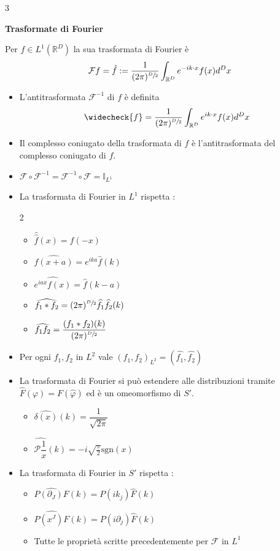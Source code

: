 \documentclass[10pt,a4paper]{report}
\begin{document}
\begin{multicols*}{3}
\begin{center}
\textbf{\boldmath Trasformate di Fourier\unboldmath} \par
Per $f\in L^1(\mathbb{R}^D)$ la sua trasformata di Fourier è 
\[
	\mathcal{F}f=\hat{f}:=\dfrac{1}{(2\pi)^{\sfrac{D}{2}}} \int_{\mathbb{R}^D} e^{-ik\cdot x}f(x) d^Dx
\]
	\begin{itemize}[label=$\cdot$]
		\item L'antitrasformata $\mathcal{F}^{-1}$ di $f$ è definita \[\widecheck{f}=\dfrac{1}{(2\pi)^{\sfrac{D}{2}}} \int_{\mathbb{R}^D} e^{ik\cdot x}f(x) d^Dx\]
		\item Il complesso coniugato della trasformata di $f$ è l'antitrasformata del complesso coniugato di $f$.
		\item $\mathcal{F}\circ\mathcal{F}^{-1}=\mathcal{F}^{-1}\circ\mathcal{F}=\mathbb{I}_{L^1}$
		\item La trasformata di Fourier in $L^1$ rispetta :
			\begin{multicols*}{2}
				\begin{itemize}[label=$\cdot$]
					\item $\widehat{\widehat{f}}(x)=f(-x)$
					\item $\widehat{f(x+a)}=e^{ika}\widehat{f}(k)$
					\item $\widehat{e^{iax}f(x)}=\widehat{f}(k-a) $
					\item $\widehat{f_1*f_2}=(2\pi)^{\sfrac{D}{2}} \widehat{f_1}\widehat{f_2}(k)$
					\item $\widehat{f_1f_2}=\dfrac{(f_1*f_2)(k)}{(2\pi)^{\sfrac{D}{2}}}$
				\end{itemize}
			\end{multicols*}
		\item Per ogni $f_1,f_2$ in $L^2$ vale $(f_1,f_2)_{L^2}=(\widehat{f_1},\widehat{f_2})$
		\item La trasformata di Fourier si può estendere alle distribuzioni tramite $\widehat{F}(\varphi)=F(\widehat{\varphi})$ ed è un omeomorfismo di $S'$.
			\begin{itemize}[label=$\cdot$]
					\item $\widehat{\delta(x)}(k)=\dfrac{1}{\sqrt{2\pi}}$
					\item $\widehat{\mathcal{P}\dfrac{1}{x}}(k)=-i\sqrt{\frac{\pi}{2}}\text{sgn}(x)$
			\end{itemize}
		\item La trasformata di Fourier in $S'$ rispetta :
			\begin{itemize}[label=$\cdot$]
				\item $\widehat{P(\partial_J)F}(k)=P(ik_j)\widehat{F}(k)$
				\item $\widehat{P(x^J)F}(k)=P(i\partial_j)\widehat{F}(k)$
				\item Tutte le proprietà scritte precedentemente per $\mathcal{F}$ in $L^1$
			\end{itemize}
	\end{itemize}
\end{center}

\end{multicols*}
\end{document}
